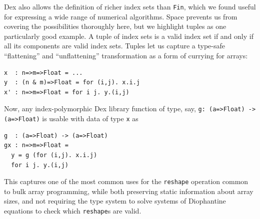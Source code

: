 \documentclass[acmsmall,screen,nonacm]{acmart}
\newlength{\codeindent}
\begin{document}
Dex also allows the definition of richer index sets than \texttt{Fin}, which we found useful for expressing a wide range of numerical algorithms.
Space prevents us from covering the possibilities thoroughly here, but we highlight tuples as one particularly good example.
A tuple of index sets is a valid index set if and only if all its components are valid index sets.
Tuples let us capture a type-safe ``flattening'' and ``unflattening'' transformation as a form of currying for arrays:
\begin{Verbatim}[xleftmargin=\codeindent,fontsize=\small]
x  : n=>m=>Float = ...
y  : (n & m)=>Float = for (i,j). x.i.j
x' : n=>m=>Float = for i j. y.(i,j)
\end{Verbatim}
Now, any index-polymorphic Dex library function of type, say, \verb|g: (a=>Float) -> (a=>Float)| is usable with data of type \texttt{x} as
\begin{Verbatim}[xleftmargin=\codeindent,fontsize=\small]
g  : (a=>Float) -> (a=>Float)
gx : n=>m=>Float =
  y = g (for (i,j). x.i.j)
  for i j. y.(i,j)
\end{Verbatim}
This captures one of the most common uses for the \texttt{reshape} operation common to bulk array programming, while both preserving static information about array sizes, and not requiring the type system to solve systems of Diophantine equations to check which \texttt{reshape}s are valid.




\end{document}
